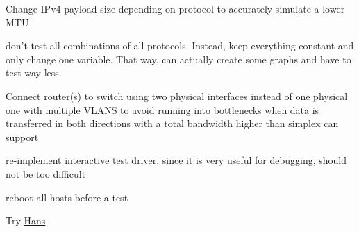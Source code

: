 Change IPv4 payload size depending on protocol to accurately simulate a lower MTU

don't test all combinations of all protocols.
Instead, keep everything constant and only change one variable.
That way, can actually create some graphs and have to test way less.


Connect router(s) to switch using two physical interfaces instead of one physical one with multiple VLANS to avoid running into bottlenecks when data is transferred in both directions with a total bandwidth higher than simplex can support

re-implement interactive test driver, since it is very useful for debugging, should not be too difficult

reboot all hosts before a test

Try \href{https://code.gerade.org/hans/}{Hans}
